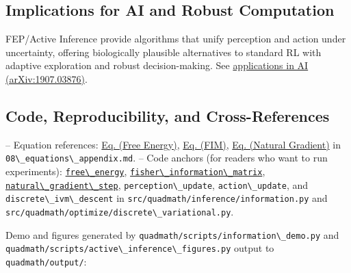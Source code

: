 \documentclass[
  10pt,
]{article}
\newcommand{\passthrough}[1]{#1}
\begin{document}
\subsection{Implications for AI and Robust
Computation}\label{implications-for-ai-and-robust-computation}

FEP/Active Inference provide algorithms that unify perception and action
under uncertainty, offering biologically plausible alternatives to
standard RL with adaptive exploration and robust decision-making. See
\href{https://arxiv.org/abs/1907.03876}{applications in AI
(arXiv:1907.03876)}.

\subsection{Code, Reproducibility, and
Cross-References}\label{code-reproducibility-and-cross-references}

-- Equation references:
\href{08_equations_appendix.md\#eq:free_energy}{Eq. (Free Energy)},
\href{08_equations_appendix.md\#eq:fim}{Eq. (FIM)},
\href{08_equations_appendix.md\#eq:natgrad}{Eq. (Natural Gradient)} in
\passthrough{\lstinline!08\_equations\_appendix.md!}. -- Code anchors
(for readers who want to run experiments):
\href{03_quadray_methods.md\#code:free_energy}{\passthrough{\lstinline!free\_energy!}},
\href{03_quadray_methods.md\#code:fisher_information_matrix}{\passthrough{\lstinline!fisher\_information\_matrix!}},
\href{03_quadray_methods.md\#code:natural_gradient_step}{\passthrough{\lstinline!natural\_gradient\_step!}},
\passthrough{\lstinline!perception\_update!},
\passthrough{\lstinline!action\_update!}, and
\passthrough{\lstinline!discrete\_ivm\_descent!} in
\passthrough{\lstinline!src/quadmath/inference/information.py!} and
\passthrough{\lstinline!src/quadmath/optimize/discrete\_variational.py!}.

Demo and figures generated by
\passthrough{\lstinline!quadmath/scripts/information\_demo.py!} and
\passthrough{\lstinline!quadmath/scripts/active\_inference\_figures.py!}
output to \passthrough{\lstinline!quadmath/output/!}:
\end{document}
